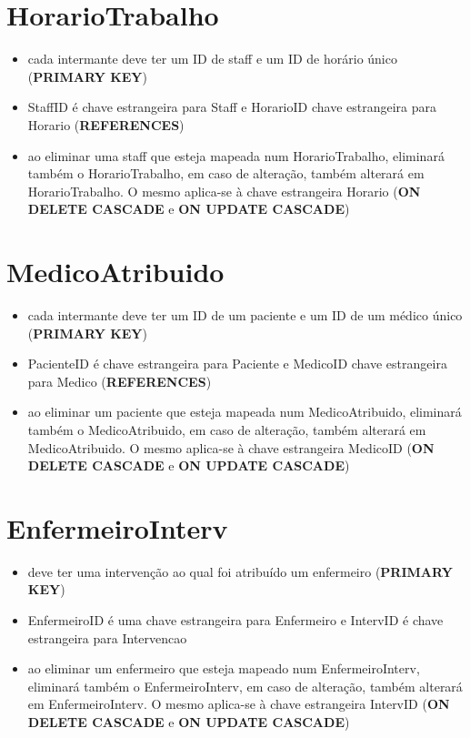 \documentclass[article, a4paper, 12pt, oneside]{memoir}
\begin{document}
\section*{HorarioTrabalho}
\begin{itemize}
	\item cada intermante deve ter um ID de staff e um ID de horário único (\textbf{PRIMARY KEY})
	\item StaffID é chave estrangeira para Staff e HorarioID chave estrangeira para Horario (\textbf{REFERENCES})
	\item ao eliminar uma staff que esteja mapeada num HorarioTrabalho, eliminará também o HorarioTrabalho, em caso de alteração, também alterará em HorarioTrabalho. O mesmo aplica-se à chave estrangeira Horario (\textbf{ON DELETE CASCADE} e \textbf{ON UPDATE CASCADE})
\end{itemize}

\section*{MedicoAtribuido}
\begin{itemize}
	\item cada intermante deve ter um ID de um paciente e um ID de um médico único (\textbf{PRIMARY KEY})
	\item PacienteID é chave estrangeira para Paciente e MedicoID chave estrangeira para Medico (\textbf{REFERENCES})
	\item ao eliminar um paciente que esteja mapeada num MedicoAtribuido, eliminará também o MedicoAtribuido, em caso de alteração, também alterará em MedicoAtribuido. O mesmo aplica-se à chave estrangeira MedicoID (\textbf{ON DELETE CASCADE} e \textbf{ON UPDATE CASCADE})
\end{itemize}

\section*{EnfermeiroInterv}
\begin{itemize}
	\item deve ter uma intervenção ao qual foi atribuído um enfermeiro (\textbf{PRIMARY KEY})
	\item EnfermeiroID é uma chave estrangeira para Enfermeiro e IntervID é chave estrangeira para Intervencao
	\item ao eliminar um enfermeiro que esteja mapeado num EnfermeiroInterv, eliminará também o EnfermeiroInterv, em caso de alteração, também alterará em EnfermeiroInterv. O mesmo aplica-se à chave estrangeira IntervID (\textbf{ON DELETE CASCADE} e \textbf{ON UPDATE CASCADE})
\end{itemize}
\end{document}
